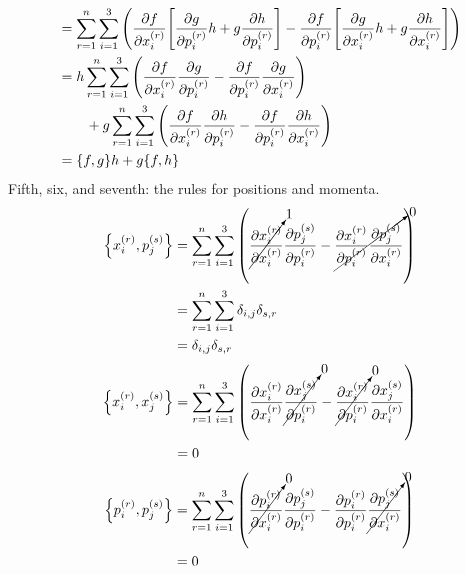 \documentclass[boxes]{homework}
\makeatletter
\numberwithin{@problem}{section}
\makeatother
\begin{document}
\begin{solution}
\begin{align*}
		           & = \sum_{r=1}^{n} \sum_{i=1}^{3}\qty(\pdv{f}{x_{i}^{(r)}}\qty[\pdv{g}{p_{i}^{(r)}}h + g\pdv{h}{p_{i}^{(r)}}] - \pdv{f}{p_{i}^{(r)}}\qty[\pdv{g}{x_{i}^{(r)}}h + g\pdv{h}{x_{i}^{(r)}}]) \\
		           & = h\sum_{r=1}^{n} \sum_{i=1}^{3} \qty(\pdv{f}{x_{i}^{(r)}}\pdv{g}{p_{i}^{(r)}} - \pdv{f}{p_{i}^{(r)}}\pdv{g}{x_{i}^{(r)}})                                                             \\
		           & \qquad + g\sum_{r=1}^{n} \sum_{i=1}^{3} \qty(\pdv{f}{x_{i}^{(r)}}\pdv{h}{p_{i}^{(r)}} - \pdv{f}{p_{i}^{(r)}}\pdv{h}{x_{i}^{(r)}})                                                      \\
		           & = \pb{f}{g}h + g\pb{f}{h}
	\end{align*}
	Fifth, six, and seventh: the rules for positions and momenta.
	\begin{align*}
		\pb{x_i^{(r)}}{p_j^{(s)}} & = \sum_{r=1}^{n} \sum_{i=1}^{3}\qty(\cancelto{1}{\pdv{x_i^{(r)}}{x_{i}^{(r)}}} \pdv{p_j^{(s)}}{p_{i}^{(r)}} - \cancelto{0}{\pdv{x_i^{(r)}}{p_{i}^{(r)}} \pdv{p_j^{(s)}}{x_{i}^{(r)}}}) \\
		                          & = \sum_{r=1}^{n} \sum_{i=1}^{3}\delta_{i,j}\delta_{s,r}                                                                                                                                \\
		                          & = \delta_{i,j}\delta_{s,r}                                                                                                                                                             \\
	\end{align*}
	\begin{align*}
		\pb{x_i^{(r)}}{x_j^{(s)}} & = \sum_{r=1}^{n} \sum_{i=1}^{3}\qty(\pdv{x_i^{(r)}}{x_{i}^{(r)}} \cancelto{0}{\pdv{x_j^{(s)}}{p_{i}^{(r)}}} - \cancelto{0}{\pdv{x_i^{(r)}}{p_{i}^{(r)}}} \pdv{x_j^{(s)}}{x_{i}^{(r)}}) \\
		                          & = 0
	\end{align*}
	\begin{align*}
		\pb{p_i^{(r)}}{p_j^{(s)}} & = \sum_{r=1}^{n} \sum_{i=1}^{3}\qty(\cancelto{0}{\pdv{p_i^{(r)}}{x_{i}^{(r)}}} \pdv{p_j^{(s)}}{p_{i}^{(r)}} - \pdv{p_i^{(r)}}{p_{i}^{(r)}} \cancelto{0}{\pdv{p_j^{(s)}}{x_{i}^{(r)}}}) \\
		                          & = 0
	\end{align*}
\end{solution}
\end{document}
